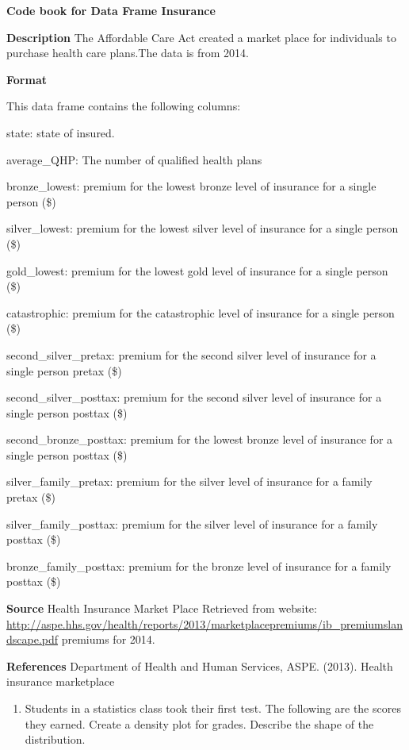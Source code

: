 \documentclass[
]{book}
\providecommand{\tightlist}{%
  \setlength{\itemsep}{0pt}\setlength{\parskip}{0pt}}
\begin{document}
\textbf{Code book for Data Frame Insurance}

\textbf{Description}
The Affordable Care Act created a market place for individuals to purchase health care plans.The data is from 2014.

\textbf{Format}

This data frame contains the following columns:

state: state of insured.

average\_QHP: The number of qualified health plans

bronze\_lowest: premium for the lowest bronze level of insurance for a single person (\$)

silver\_lowest: premium for the lowest silver level of insurance for a single person (\$)

gold\_lowest: premium for the lowest gold level of insurance for a single person (\$)

catastrophic: premium for the catastrophic level of insurance for a single person (\$)

second\_silver\_pretax: premium for the second silver level of insurance for a single person pretax (\$)

second\_silver\_posttax: premium for the second silver level of insurance for a single person posttax (\$)

second\_bronze\_posttax: premium for the lowest bronze level of insurance for a single person posttax (\$)

silver\_family\_pretax: premium for the silver level of insurance for a family pretax (\$)

silver\_family\_posttax: premium for the silver level of insurance for a family posttax (\$)

bronze\_family\_posttax: premium for the bronze level of insurance for a family posttax (\$)

\textbf{Source}
Health Insurance Market Place Retrieved from website:
\url{http://aspe.hhs.gov/health/reports/2013/marketplacepremiums/ib_premiumslandscape.pdf}
premiums for 2014.

\textbf{References}
Department of Health and Human Services, ASPE. (2013). Health insurance marketplace

\begin{enumerate}
\def\labelenumi{\arabic{enumi}.}
\setcounter{enumi}{3}
\tightlist
\item
  Students in a statistics class took their first test. The following are the scores they earned. Create a density plot for grades. Describe the shape of the distribution.
\end{enumerate}
\end{document}
